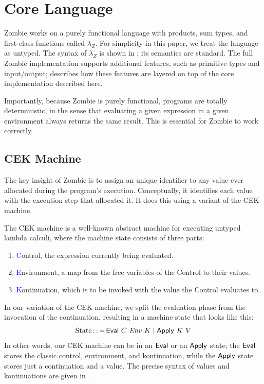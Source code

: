 \section{Core Language}	

Zombie works on a purely functional language with products, sum types,
and first-class functions called $\lambda_Z$. For simplicity in this
paper, we treat the language as untyped. The syntax of $\lambda_Z$ is
shown in ; its semantics are standard. The full
Zombie implementation supports additional features, such as primitive
types and input/output;  describes how these features
are layered on top of the core implementation described here.

Importantly, because Zombie is purely functional, programs are totally
deterministic, in the sense that evaluating a given expression in a
given environment always returns the same result. This is essential
for Zombie to work correctly.

\subsection{CEK Machine}

The key insight of Zombie is to assign an unique identifier to any
value ever allocated during the program's execution. Conceptually, it
identifies each value with the execution step that allocated it. It
does this using a variant of the CEK machine.

The CEK machine is a well-known abstract machine for executing untyped
lambda calculi, where the machine state consists of three parts:

\begin{enumerate}
	\item \textcolor{blue}{C}ontrol, the expression currently being evaluated.
	\item \textcolor{blue}{E}nvironment,
          a map from the free variables of the Control to their values.
	\item \textcolor{blue}{K}ontinuation, which is to be invoked
          with the value the Control evaluates to.
\end{enumerate}

In our variation of the CEK machine, we split the evaluation phase
from the invocation of the continuation, resulting in a machine state
that looks like this:
\[
\text{State} \operatorname{::=} \text{\textsf{Eval}}~C~\mathit{Env}~K \mid \text{\textsf{Apply}}~K~V
\]
In other words, our CEK machine can be in an $\text{\textsf{Eval}}$ or an $\text{\textsf{Apply}}$
state; the $\text{\textsf{Eval}}$ stores the classic control, environment, and
kontinuation, while the $\text{\textsf{Apply}}$ state stores just a continuation and
a value. The precise syntax of values and kontinuations are given in
.

